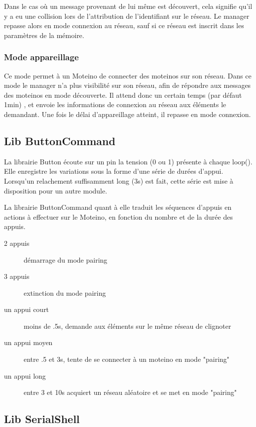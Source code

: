 \documentclass{report}
\begin{document}
Dans le cas où un message provenant de lui même est découvert, cela signifie qu'il y a eu une collision lors de l'attribution de l'identifiant sur le réseau. Le manager repasse alors en mode connexion au réseau, sauf si ce réseau est inscrit dans les paramètres de la mémoire.

\subsubsection{Mode appareillage}

Ce mode permet à un Moteino de connecter des moteinos sur son réseau. Dans ce mode le manager n'a plus visibilité sur son réseau, afin de répondre aux messages des moteinos en mode découverte. Il attend donc un certain temps (par défaut 1min) , et envoie les informations de connexion au réseau aux éléments le demandant. Une fois le délai d'appareillage atteint, il repasse en mode connexion.

\subsection{Lib ButtonCommand}

La librairie Button écoute sur un pin la tension (0 ou 1) présente à chaque loop(). Elle enregistre les variations sous la forme d'une série de durées d'appui. Lorsqu'un relachement suffisamment long (3s) est fait, cette série est mise à disposition pour un autre module.

La librairie ButtonCommand quant à elle traduit les séquences d'appuis en actions à effectuer sur le Moteino, en fonction du nombre et de la durée des appuis.
\begin{description}
\item[2 appuis] démarrage du mode pairing
\item[3 appuis] extinction du mode pairing
\item[un appui court] moins de .5s, demande aux éléments sur le même réseau de clignoter
\item[un appui moyen] entre .5 et 3s, tente de se connecter à un moteino en mode "pairing"
\item[un appui long] entre 3 et 10s acquiert un réseau aléatoire et se met en mode "pairing"
\end{description}

\subsection{Lib SerialShell}
\end{document}
